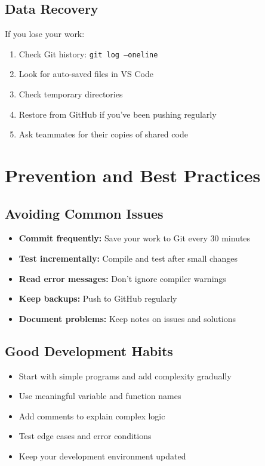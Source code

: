 \documentclass[11pt,a4paper]{article}
\begin{document}
\subsection{Data Recovery}

If you lose your work:

\begin{enumerate}
    \item Check Git history: \texttt{git log --oneline}
    \item Look for auto-saved files in VS Code
    \item Check temporary directories
    \item Restore from GitHub if you've been pushing regularly
    \item Ask teammates for their copies of shared code
\end{enumerate}

\section{Prevention and Best Practices}

\subsection{Avoiding Common Issues}

\begin{itemize}
    \item \textbf{Commit frequently:} Save your work to Git every 30 minutes
    \item \textbf{Test incrementally:} Compile and test after small changes
    \item \textbf{Read error messages:} Don't ignore compiler warnings
    \item \textbf{Keep backups:} Push to GitHub regularly
    \item \textbf{Document problems:} Keep notes on issues and solutions
\end{itemize}

\subsection{Good Development Habits}

\begin{itemize}
    \item Start with simple programs and add complexity gradually
    \item Use meaningful variable and function names
    \item Add comments to explain complex logic
    \item Test edge cases and error conditions
    \item Keep your development environment updated
\end{itemize}
\end{document}
